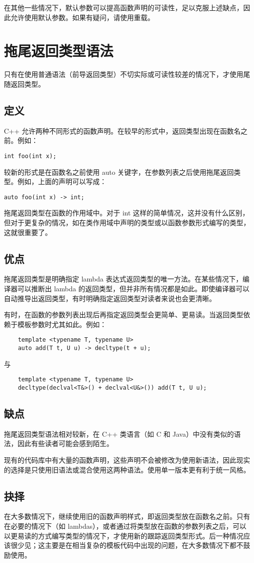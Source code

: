 在其他一些情况下，默认参数可以提高函数声明的可读性，足以克服上述缺点，因此允许使用默认参数。如果有疑问，请使用重载。


\section{拖尾返回类型语法}
只有在使用普通语法（前导返回类型）不切实际或可读性较差的情况下，才使用尾随返回类型。


\subsection{定义}
C++ 允许两种不同形式的函数声明。在较早的形式中，返回类型出现在函数名之前。例如：
\begin{verbatim}
int foo(int x);
\end{verbatim}

较新的形式是在函数名之前使用 auto 关键字，在参数列表之后使用拖尾返回类型。例如，上面的声明可以写成：
\begin{verbatim}
auto foo(int x) -> int;
\end{verbatim}

拖尾返回类型在函数的作用域中。对于 int 这样的简单情况，这并没有什么区别，但对于更复杂的情况，如在类作用域中声明的类型或以函数参数形式编写的类型，这就很重要了。


\subsection{优点}
拖尾返回类型是明确指定 lambda 表达式返回类型的唯一方法。在某些情况下，编译器可以推断出 lambda 的返回类型，但并非所有情况都是如此。即使编译器可以自动推导出返回类型，有时明确指定返回类型对读者来说也会更清晰。

有时，在函数的参数列表出现后再指定返回类型会更简单、更易读。当返回类型依赖于模板参数时尤其如此。例如：
\begin{verbatim}
    template <typename T, typename U>
    auto add(T t, U u) -> decltype(t + u);
\end{verbatim}
与
\begin{verbatim}
    template <typename T, typename U>
    decltype(declval<T&>() + declval<U&>()) add(T t, U u);
\end{verbatim}


\subsection{缺点}
拖尾返回类型语法相对较新，在 C++ 类语言（如 C 和 Java）中没有类似的语法，因此有些读者可能会感到陌生。

现有的代码库中有大量的函数声明，这些声明不会被修改为使用新语法，因此现实的选择是只使用旧语法或混合使用这两种语法。使用单一版本更有利于统一风格。


\subsection{抉择}
在大多数情况下，继续使用旧的函数声明样式，即返回类型放在函数名之前。只有在必要的情况下（如 lambdas），或者通过将类型放在函数的参数列表之后，可以以更易读的方式编写类型的情况下，才使用新的跟踪返回类型形式。后一种情况应该很少见；这主要是在相当复杂的模板代码中出现的问题，在大多数情况下都不鼓励使用。


